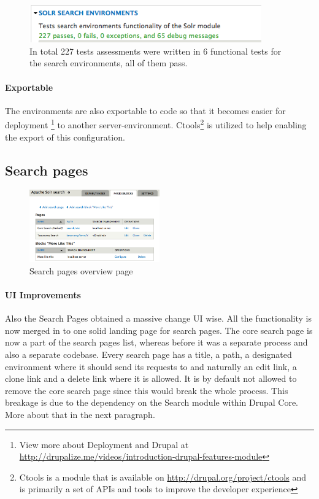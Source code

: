 \begin{figure}[H]
     \includegraphics[width=10cm]{images/implementation/test_search_environments.png}
     \caption{In total 227 tests assessments were written in 6 functional tests for the search environments, all of them pass.}
\end{figure}

\paragraph{Exportable}
The environments are also exportable to code so that it becomes easier for deployment \footnote{View more about Deployment and Drupal at \url{http://drupalize.me/videos/introduction-drupal-features-module}} to another server-environment. Ctools\footnote{Ctools is a module that is available on \url{http://drupal.org/project/ctools} and is primarily a set of APIs and tools to improve the developer experience} is utilized to help enabling the export of this configuration.

\subsection{Search pages}
\begin{figure}
\begin{center}
     \includegraphics[width=0.5\textwidth]{images/implementation/search_pages_overview.png}
     \caption{Search pages overview page}
\end{center}
\end{figure}
\paragraph{UI Improvements}Also the Search Pages obtained a massive change UI wise. All the functionality is now merged in to one solid landing page for search pages. The core search page is now a part of the search pages list, whereas before it was a separate process and also a separate codebase. Every search page has a title, a path, a designated environment where it should send its requests to and naturally an edit link, a clone link and a delete link where it is allowed. It is by default not allowed to remove the core search page since this would break the whole process. 
This breakage is due to the dependency on the Search module within Drupal Core. More about that in the next paragraph. 

